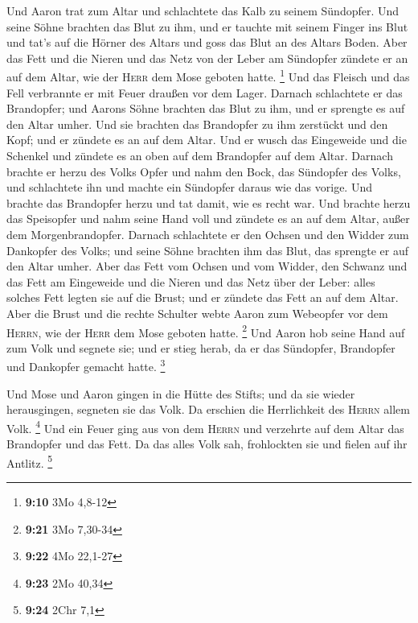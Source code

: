  Und Aaron trat zum Altar und schlachtete das Kalb zu
seinem Sündopfer.  Und seine Söhne brachten das Blut zu
ihm, und er tauchte mit seinem Finger ins Blut und tat's auf die Hörner
des Altars und goss das Blut an des Altars Boden.  Aber
das Fett und die Nieren und das Netz von der Leber am Sündopfer zündete
er an auf dem Altar, wie der \textsc{Herr} dem Mose geboten hatte.
\footnote{\textbf{9:10} 3Mo 4,8-12}  Und das Fleisch und
das Fell verbrannte er mit Feuer draußen vor dem Lager. 
Darnach schlachtete er das Brandopfer; und Aarons Söhne brachten das
Blut zu ihm, und er sprengte es auf den Altar umher.  Und
sie brachten das Brandopfer zu ihm zerstückt und den Kopf; und er
zündete es an auf dem Altar.  Und er wusch das Eingeweide
und die Schenkel und zündete es an oben auf dem Brandopfer auf dem
Altar.  Darnach brachte er herzu des Volks Opfer und nahm
den Bock, das Sündopfer des Volks, und schlachtete ihn und machte ein
Sündopfer daraus wie das vorige.  Und brachte das
Brandopfer herzu und tat damit, wie es recht war.  Und
brachte herzu das Speisopfer und nahm seine Hand voll und zündete es an
auf dem Altar, außer dem Morgenbrandopfer.  Darnach
schlachtete er den Ochsen und den Widder zum Dankopfer des Volks; und
seine Söhne brachten ihm das Blut, das sprengte er auf den Altar umher.
 Aber das Fett vom Ochsen und vom Widder, den Schwanz und
das Fett am Eingeweide und die Nieren und das Netz über der Leber:
 alles solches Fett legten sie auf die Brust; und er
zündete das Fett an auf dem Altar.  Aber die Brust und
die rechte Schulter webte Aaron zum Webeopfer vor dem \textsc{Herrn},
wie der \textsc{Herr} dem Mose geboten hatte. \footnote{\textbf{9:21}
  3Mo 7,30-34}  Und Aaron hob seine Hand auf zum Volk und
segnete sie; und er stieg herab, da er das Sündopfer, Brandopfer und
Dankopfer gemacht hatte. \footnote{\textbf{9:22} 4Mo 22,1-27}

 Und Mose und Aaron gingen in die Hütte des Stifts; und
da sie wieder herausgingen, segneten sie das Volk. Da erschien die
Herrlichkeit des \textsc{Herrn} allem Volk. \footnote{\textbf{9:23} 2Mo
  40,34}  Und ein Feuer ging aus von dem \textsc{Herrn}
und verzehrte auf dem Altar das Brandopfer und das Fett. Da das alles
Volk sah, frohlockten sie und fielen auf ihr Antlitz. \footnote{\textbf{9:24}
  2Chr 7,1}

